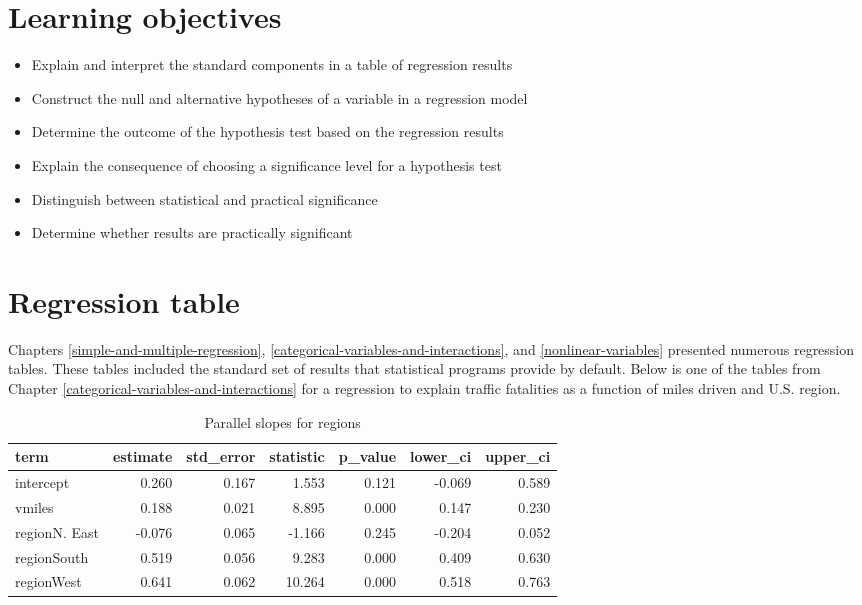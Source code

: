 \documentclass[
]{book}
\providecommand{\tightlist}{%
  \setlength{\itemsep}{0pt}\setlength{\parskip}{0pt}}
\begin{document}
\hypertarget{lo12}{%
\section{Learning objectives}\label{lo12}}

\begin{itemize}
\tightlist
\item
  Explain and interpret the standard components in a table of regression results
\item
  Construct the null and alternative hypotheses of a variable in a regression model
\item
  Determine the outcome of the hypothesis test based on the regression results
\item
  Explain the consequence of choosing a significance level for a hypothesis test
\item
  Distinguish between statistical and practical significance
\item
  Determine whether results are practically significant
\end{itemize}

\hypertarget{regression-table}{%
\section{Regression table}\label{regression-table}}

Chapters \ref{simple-and-multiple-regression}, \ref{categorical-variables-and-interactions}, and \ref{nonlinear-variables} presented numerous regression tables. These tables included the standard set of results that statistical programs provide by default. Below is one of the tables from Chapter \ref{categorical-variables-and-interactions} for a regression to explain traffic fatalities as a function of miles driven and U.S. region.

\begin{table}

\caption{\label{tab:extable}Parallel slopes for regions}
\centering
\begin{tabular}[t]{l|r|r|r|r|r|r}
\hline
term & estimate & std\_error & statistic & p\_value & lower\_ci & upper\_ci\\
\hline
intercept & 0.260 & 0.167 & 1.553 & 0.121 & -0.069 & 0.589\\
\hline
vmiles & 0.188 & 0.021 & 8.895 & 0.000 & 0.147 & 0.230\\
\hline
regionN. East & -0.076 & 0.065 & -1.166 & 0.245 & -0.204 & 0.052\\
\hline
regionSouth & 0.519 & 0.056 & 9.283 & 0.000 & 0.409 & 0.630\\
\hline
regionWest & 0.641 & 0.062 & 10.264 & 0.000 & 0.518 & 0.763\\
\hline
\end{tabular}
\end{table}
\end{document}
